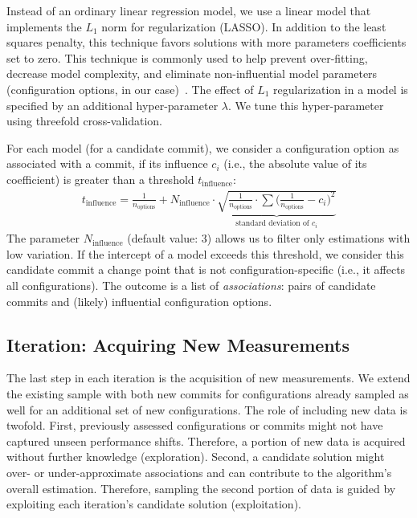 \documentclass[sigconf]{acmart}
\begin{document}
	Instead of an ordinary linear regression model, we use a linear model that implements the $L_1$ norm for regularization (LASSO). In addition to the least squares penalty, this technique favors solutions with more parameters coefficients set to zero.
	This technique is commonly used to help prevent over-fitting, decrease model complexity, and eliminate non-influential model parameters (configuration options, in our case)~\cite{lasso}. The effect of $L_1$ regularization in a model is specified by an additional hyper-parameter $\lambda$. We tune this hyper-parameter using threefold cross-validation.
	
	For each model (for a candidate commit), we consider a configuration option as associated with a commit, if its influence $c_i$ (i.e., the absolute value of its coefficient) is greater than a threshold $t_\text{influence}$:
	{\color{red}\begin{equation}
	\begin{gathered}
	t_\text{influence} = \frac{1}{n_\text{options}} + N_\text{influence} \cdot \underbrace{\sqrt{\frac{1}{n_\text{options}} \cdot \sum \Big(\frac{1}{n_\text{options}} - c_i\Big)^2}}_{\text{standard deviation of } c_i}
	\label{eq:t_influence}
	\end{gathered}
	\end{equation}
	The parameter $N_\text{influence}$ (default value: 3) allows us to filter only estimations with low variation. If the intercept of a model exceeds this threshold, we consider this candidate commit a change point that is not configuration-specific (i.e., it affects all configurations). The outcome is a list of \emph{associations}: pairs of candidate commits and (likely) influential configuration options. }
	
	\subsection{Iteration: Acquiring New Measurements}\label{sec:acquisition}
	The last step in each iteration is the acquisition of new measurements. We extend the existing sample with both new commits for configurations already sampled as well for an additional set of new configurations. The role of including new data is twofold. First, previously assessed configurations or commits might not have captured unseen performance shifts. Therefore, a portion of new data is acquired without further knowledge (exploration). Second, a candidate solution might over- or under-approximate associations and can contribute to the algorithm's overall estimation. Therefore, sampling the second portion of data is guided by exploiting each iteration's candidate solution (exploitation).
	
\end{document}
